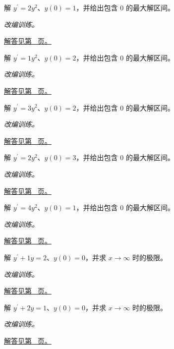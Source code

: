 \documentclass[12pt,fontset=fandol]{ctexart}
\begin{document}
\begin{example}[分离变量与有限时刻发散]\label{ex:c22q8}
解 $y^{\prime}=2y^2$、$y(0)=1$，并给出包含 $0$ 的最大解区间。
\par\textit{改编训练。}\par\hyperref[ans:c22q8]{解答见第~\pageref{ans:c22q8} 页。}
\end{example}
\begin{example}[分离变量与有限时刻发散]\label{ex:c22q9}
解 $y^{\prime}=1y^2$、$y(0)=2$，并给出包含 $0$ 的最大解区间。
\par\textit{改编训练。}\par\hyperref[ans:c22q9]{解答见第~\pageref{ans:c22q9} 页。}
\end{example}
\begin{example}[分离变量与有限时刻发散]\label{ex:c22q10}
解 $y^{\prime}=3y^2$、$y(0)=2$，并给出包含 $0$ 的最大解区间。
\par\textit{改编训练。}\par\hyperref[ans:c22q10]{解答见第~\pageref{ans:c22q10} 页。}
\end{example}
\begin{example}[分离变量与有限时刻发散]\label{ex:c22q11}
解 $y^{\prime}=2y^2$、$y(0)=3$，并给出包含 $0$ 的最大解区间。
\par\textit{改编训练。}\par\hyperref[ans:c22q11]{解答见第~\pageref{ans:c22q11} 页。}
\end{example}
\begin{example}[分离变量与有限时刻发散]\label{ex:c22q12}
解 $y^{\prime}=4y^2$、$y(0)=1$，并给出包含 $0$ 的最大解区间。
\par\textit{改编训练。}\par\hyperref[ans:c22q12]{解答见第~\pageref{ans:c22q12} 页。}
\end{example}
\begin{example}[积分因子解线性方程]\label{ex:c22q13}
解 $y^{\prime}+1y=2$、$y(0)=0$，并求 $x\to\infty$ 时的极限。
\par\textit{改编训练。}\par\hyperref[ans:c22q13]{解答见第~\pageref{ans:c22q13} 页。}
\end{example}
\begin{example}[积分因子解线性方程]\label{ex:c22q14}
解 $y^{\prime}+2y=1$、$y(0)=0$，并求 $x\to\infty$ 时的极限。
\par\textit{改编训练。}\par\hyperref[ans:c22q14]{解答见第~\pageref{ans:c22q14} 页。}
\end{example}
\end{document}
